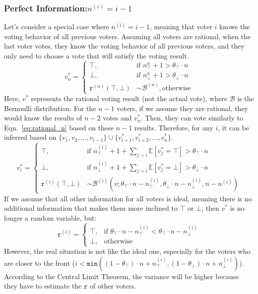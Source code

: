 \documentclass[11pt]{article}
\begin{document}
  \subsubsection{Perfect Information:$n^{(i)}=i-1$}
  \label{sec:perfect_information}
  Let's consider a special case where $n^{(i)}=i-1$, meaning that voter $i$ knows the voting behavior of all previous voters. Assuming all voters are rational, when the last voter votes, they know the voting behavior of all previous voters, and they only need to choose a vote that will satisfy the voting result.
  \begin{equation}
    \label{eq:rational_n}
    v^*_n = 
    \begin{cases}
      \top, &\text{if }n^n_\top+1>\theta_\top\cdot n\\
      \bot, &\text{if }n^n_\bot+1>\theta_\bot\cdot n\\
      \texttt{r}^{(n)}(\top,\bot) &\sim \mathcal{B}^{(n)}, \text{otherwise}
    \end{cases}
  \end{equation}
  Here, $v^*$ represents the rational voting result (not the actual vote), where $\mathcal{B}$ is the Bernoulli distribution.
  For the $n-1$ voters, if we assume they are rational, they would know the results of $n-2$ votes and $v^*_n$. Then, they can vote similarly to Eqn.~\ref{eq:rational_n} based on these $n-1$ results. Therefore, for any $i$, it can be inferred based on $\{v_1,v_2, \ldots,v_{i-1}\} \cup \{v^*_{i+1},v^*_{i+2},\ldots,v^*_n\}$.
  \begin{equation}
    \label{eq:rational_i}
    v^*_i = 
    \begin{cases}
      \top, &\text{if }n^{(i)}_\top+1+\sum_{j>i}{\mathbb{E}[v^*_j=\top]}>\theta_\top\cdot n\\
      \bot, &\text{if }n^{(i)}_\bot+1+\sum_{j>i}{\mathbb{E}[v^*_j=\bot]}>\theta_\bot\cdot n\\
      \texttt{r}^{(i)}(\top,\bot) &\sim \mathcal{B}^{(i)}(v;\theta_\top\cdot n-n^{(i)}_\top,\theta_\bot\cdot n-n^{(i)}_\bot,n-n^{(i)})
    \end{cases}
  \end{equation}
  If we assume that all other information for all voters is ideal, meaning there is no additional information that makes them more inclined to $\top$ or $\bot$, then $v^*$ is no longer a random variable, but:
  \begin{equation}
    \label{eq:rational_determined}
    \texttt{r}^{(i)} = 
    \begin{cases}
      \top, &\text{if }\theta_\top\cdot n-n^{(i)}_\top<\theta_\top\cdot n-n^{(i)}_\bot\\
      \bot, &\text{otherwise}
    \end{cases}
  \end{equation}
  However, the real situation is not like the ideal one, especially for the voters who are closer to the front ($i<\texttt{min}((1-\theta_\top)\cdot n+n_\top^{(i)},(1-\theta_\bot)\cdot n+n_\bot^{(i)})$). According to the Central Limit Theorem, the variance will be higher because they have to estimate the $\texttt{r}$ of other voters.
\end{document}
